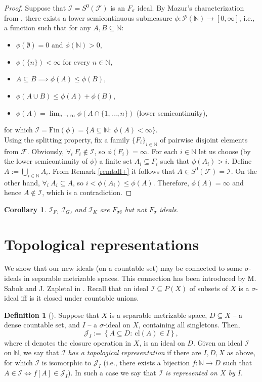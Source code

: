 \documentclass{amsart}
\newtheorem{cor}[thm]{Corollary}
\theoremstyle{definition}
\newtheorem{df}[thm]{Definition}
\newcommand{\N}{{\mathbb N}}
\newcommand{\Fin}{\textrm{Fin}}
\newcommand{\I}{\mathcal I}
\newcommand{\MB}{S^0}
\newcommand{\cl}{\mathrm{cl}}
\begin{document}
\begin{proof}
Suppose that $\I=\MB(\mathcal{F})$ is an $F_\sigma$ ideal.
By Mazur's characterization from \cite{Maz}, there exists a lower semicontinuous submeasure $\phi\colon\mathcal{P}(\N)\to [0, \infty]$, i.e., a function such that for any $A,B\subseteq\N$:
\begin{itemize}
\item $\phi(\emptyset)=0$ and $\phi(\N)>0$,
\item $\phi(\{n\})<\infty$ for every $n\in\N$,
\item $A\subseteq B \implies\phi(A)\leq \phi(B)$,
\item $\phi(A\cup B) \leq \phi(A) + \phi(B)$,
\item \label{continuity-condition} $\phi(A)=\lim_{n\to\infty} \phi(A \cap \{1,\ldots,n\})$ (lower semicontinuity),
\end{itemize}
for which $\I= \Fin(\phi)=\{A\subseteq \N :\ \phi(A)<\infty\}$.\\
Using the splitting property, fix a family $\{F_i\}_{i\in\N}$ of pairwise disjoint elements from $\mathcal{F}$.
Obviously, $\forall_{i}\ F_i\notin\I$, so $\phi(F_i)=\infty$. For each $i\in\N$ let us choose (by the lower semicontinuity of $\phi$) a finite set $A_i\subseteq F_i$ such that $\phi(A_i)>i$. Define $A:=\bigcup_{i\in\N}{A_i}$. From Remark \ref{remtall+} it follows that $A\in S^0(\mathcal{F}) = \I$. On the other hand, $\forall_{i}\ A_i \subseteq A$, so $i<\phi(A_i)\leq \phi(A)$. Therefore, $\phi(A)=\infty$ and hence $A\notin\I$, which is a contradiction.
\end{proof}

\begin{cor}
$\I_F$, $\I_G$, and $\I_K$ are $F_{\sigma\delta}$ but not $F_{\sigma}$ ideals.
\end{cor}


\section{Topological representations}

We show that our new ideals (on a countable set) may be connected to some $\sigma$-ideals in separable metrizable spaces. This connection has been introduced by M. Sabok and J. Zapletal in \cite{Sabok}. Recall that an ideal $\mathcal{I}\subseteq P(X)$ of subsets of
$X$ is a $\sigma$-ideal iff is it closed under countable unions.

\begin{df}[\cite{Sabok}]
Suppose that $X$ is a separable metrizable space, $D\subseteq X$ -- a dense countable set, and $I$ -- a $\sigma$-ideal on $X$, containing all singletons. Then,
$$\mathcal{J}_I:=\left\{A\subseteq D :\ \cl(A)\in I\right\},$$
where $\cl$ denotes the closure operation in $X$,
is an ideal on $D$. Given an ideal $\mathcal{I}$ on $\N$, we say that $\mathcal{I}$ \emph{has a topological representation} if there are $I,D,X$ as above, for which $\mathcal{I}$ is isomorphic to $\mathcal{J}_I$ (i.e., there exists a bijection $f\colon \N\to D$ such that $A\in\I \Leftrightarrow f[A]\in\mathcal{J}_I$). In such a case we say that $\mathcal{I}$ \emph{is represented on $X$ by $I$}.
\end{df}
\end{document}
